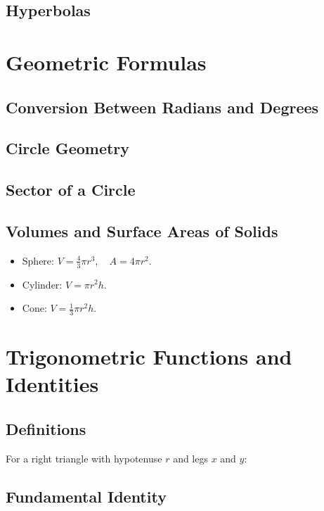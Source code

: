 \documentclass{article}
\begin{document}
\subsection{Hyperbolas}

\section{Geometric Formulas}
\subsection{Conversion Between Radians and Degrees}
\subsection{Circle Geometry}
\subsection{Sector of a Circle}
\subsection{Volumes and Surface Areas of Solids}
\begin{itemize}
  \item Sphere: \(V=\frac{4}{3}\pi r^3,\quad A=4\pi r^2\).
  \item Cylinder: \(V=\pi r^2h\).
  \item Cone: \(V=\frac{1}{3}\pi r^2h\).
\end{itemize}

\section{Trigonometric Functions and Identities}
\subsection{Definitions}
For a right triangle with hypotenuse \(r\) and legs \(x\) and \(y\):
\subsection{Fundamental Identity}
\end{document}
